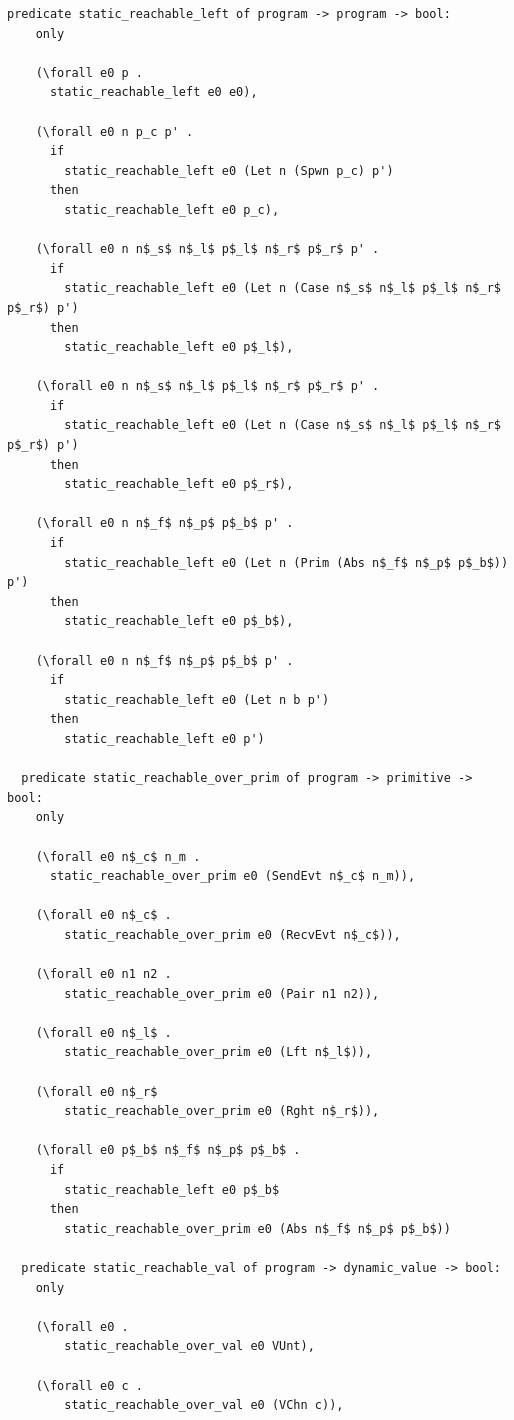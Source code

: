 \documentclass{article}
\begin{document}
\begin{lstlisting}[language=logic, mathescape]
  predicate static_reachable_left of program -> program -> bool:
    only

    (\forall e0 p .
      static_reachable_left e0 e0),

    (\forall e0 n p_c p' .
      if 
        static_reachable_left e0 (Let n (Spwn p_c) p')
      then
        static_reachable_left e0 p_c),

    (\forall e0 n n$_s$ n$_l$ p$_l$ n$_r$ p$_r$ p' .
      if
        static_reachable_left e0 (Let n (Case n$_s$ n$_l$ p$_l$ n$_r$ p$_r$) p')
      then
        static_reachable_left e0 p$_l$),

    (\forall e0 n n$_s$ n$_l$ p$_l$ n$_r$ p$_r$ p' .
      if
        static_reachable_left e0 (Let n (Case n$_s$ n$_l$ p$_l$ n$_r$ p$_r$) p')
      then
        static_reachable_left e0 p$_r$),

    (\forall e0 n n$_f$ n$_p$ p$_b$ p' .
      if
        static_reachable_left e0 (Let n (Prim (Abs n$_f$ n$_p$ p$_b$)) p')
      then
        static_reachable_left e0 p$_b$),

    (\forall e0 n n$_f$ n$_p$ p$_b$ p' .
      if
        static_reachable_left e0 (Let n b p')
      then
        static_reachable_left e0 p')

  predicate static_reachable_over_prim of program -> primitive -> bool:
    only

    (\forall e0 n$_c$ n_m .
      static_reachable_over_prim e0 (SendEvt n$_c$ n_m)),

    (\forall e0 n$_c$ .
        static_reachable_over_prim e0 (RecvEvt n$_c$)),

    (\forall e0 n1 n2 .
        static_reachable_over_prim e0 (Pair n1 n2)),

    (\forall e0 n$_l$ .
        static_reachable_over_prim e0 (Lft n$_l$)),

    (\forall e0 n$_r$
        static_reachable_over_prim e0 (Rght n$_r$)),

    (\forall e0 p$_b$ n$_f$ n$_p$ p$_b$ . 
      if
        static_reachable_left e0 p$_b$ 
      then
        static_reachable_over_prim e0 (Abs n$_f$ n$_p$ p$_b$))

  predicate static_reachable_val of program -> dynamic_value -> bool:
    only

    (\forall e0 .
        static_reachable_over_val e0 VUnt),

    (\forall e0 c .
        static_reachable_over_val e0 (VChn c)),


\end{lstlisting}
\end{document}
